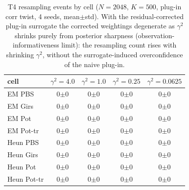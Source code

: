 \begin{table}[ht]
\centering
\caption{T4 resampling events by cell ($N=2048$, $K=500$, plug-in corr twist, 4 seeds, mean$\pm$std).  With the residual-corrected plug-in surrogate the corrected weightings degenerate as $\gamma^2$ shrinks purely from posterior sharpness (observation-informativeness limit): the resampling count rises with shrinking $\gamma^2$, without the surrogate-induced overconfidence of the naive plug-in.}
\label{tab:toy_t4_resamp}
\begin{tabular}{lcccc}
\toprule
cell & $\gamma^2=4.0$ & $\gamma^2=1.0$ & $\gamma^2=0.25$ & $\gamma^2=0.0625$ \\
\midrule
EM PBS & 0$\pm$0 & 0$\pm$0 & 0$\pm$0 & 0$\pm$0 \\
EM Girs & 0$\pm$0 & 0$\pm$0 & 0$\pm$0 & 0$\pm$0 \\
EM Pot & 0$\pm$0 & 0$\pm$0 & 0$\pm$0 & 0$\pm$0 \\
EM Pot-tr & 0$\pm$0 & 0$\pm$0 & 0$\pm$0 & 0$\pm$0 \\
Heun PBS & 0$\pm$0 & 0$\pm$0 & 0$\pm$0 & 0$\pm$0 \\
Heun Girs & 0$\pm$0 & 0$\pm$0 & 0$\pm$0 & 0$\pm$0 \\
Heun Pot & 0$\pm$0 & 0$\pm$0 & 0$\pm$0 & 0$\pm$0 \\
Heun Pot-tr & 0$\pm$0 & 0$\pm$0 & 0$\pm$0 & 0$\pm$0 \\
\bottomrule
\end{tabular}
\end{table}
